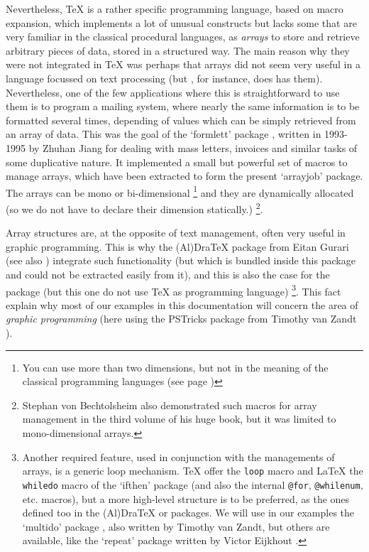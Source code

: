 \documentclass{article}
\newcommand{\AlDraTeXPackage}{\textsf{(Al)Dra\TeX}}
\newcommand{\ArrayJobPackage}{`\textsf{arrayjob}'}
\newcommand{\FormLettPackage}{`\textsf{formlett}'}
\newcommand{\IfThenPackage}{`\textsf{ifthen}'}
\newcommand{\MetaFontPackage}{\MF}
\newcommand{\MetaPostPackage}{\MP}
\newcommand{\MultiDoPackage}{`\textsf{multido}'}
\newcommand{\PSTricksPackage}{\textsf{PSTricks}}
\newcommand{\RepeatPackage}{`\textsf{repeat}'}
\newcommand{\BS}{\texttt{\symbol{`\\}}}
\newcommand{\Macro}[1]{\texttt{\BS#1}}
\begin{document}
  Nevertheless, \TeX{} is a rather specific programming language, based on
macro expansion, which implements a lot of unusual constructs but lacks some that are very familiar in the classical procedural languages, as
\emph{arrays} to store and retrieve arbitrary pieces of data, stored in a
structured way. The main reason why they were not integrated in \TeX{} was
perhaps that arrays did not seem very useful in a language focussed on text processing (but
\MetaFontPackage{}, for instance, does has them). Nevertheless, one of the few
applications where this is straightforward to use them is to program a mailing
system, where nearly the same information is to be formatted several times,
depending of values which can be simply retrieved from an array of data. This
was the goal of the \FormLettPackage{} package \cite{FORMLETT}, written in
1993-1995 by Zhuhan Jiang for dealing with mass letters, invoices and similar
tasks of some duplicative nature. It implemented a small but powerful set of
macros to manage arrays, which have been extracted to form the present
\ArrayJobPackage{} package. The arrays can be mono or bi-dimensional%
\footnote{You can use more than two dimensions, but not in the meaning of the
classical programming languages (see page \pageref{par:DataHeight})}
and they are dynamically allocated (so we do not have to declare their
dimension statically.)%
\footnote{Stephan von Bechtolsheim \cite[Volume \textsc{III}, paragraph 20.3,
page 136]{SVB93} also demonstrated such macros for array management in the
third volume of his huge book, but it was limited to mono-dimensional
arrays.}.

  Array structures are, at the opposite of text management, often very useful
in graphic programming. This is why the \AlDraTeXPackage{} package from Eitan
Gurari \cite{ALDRATEX} (see also \cite{Gur94}) integrate such functionality
(but which is bundled inside this package and could not be extracted easily
from it), and this is also the case for the \MetaPostPackage{} package
\cite{METAPOST} (but this one do not use \TeX{} as programming language)%
\footnote{Another required feature, used in conjunction with the managements
of arrays, is a generic loop mechanism. \TeX{} offer the \Macro{loop} macro
and \LaTeX{} the \Macro{whiledo} macro of the \IfThenPackage{} package (and
also the internal \Macro{@for}, \Macro{@whilenum}, etc. macros), but a more
high-level structure is to be preferred, as the ones defined too in the
\AlDraTeXPackage{} or \MetaPostPackage{} packages. We will use in our examples
the \MultiDoPackage{} package \cite{MULTIDO}, also written by Timothy van
Zandt, but others are available, like the \RepeatPackage{} package written by
Victor Eijkhout \cite{REPEAT}.}. This fact explain why most of our examples in
this documentation will concern the area of \emph{graphic programming} (here
using the \PSTricksPackage{} package from Timothy van Zandt \cite{PSTRICKS}).
\end{document}
